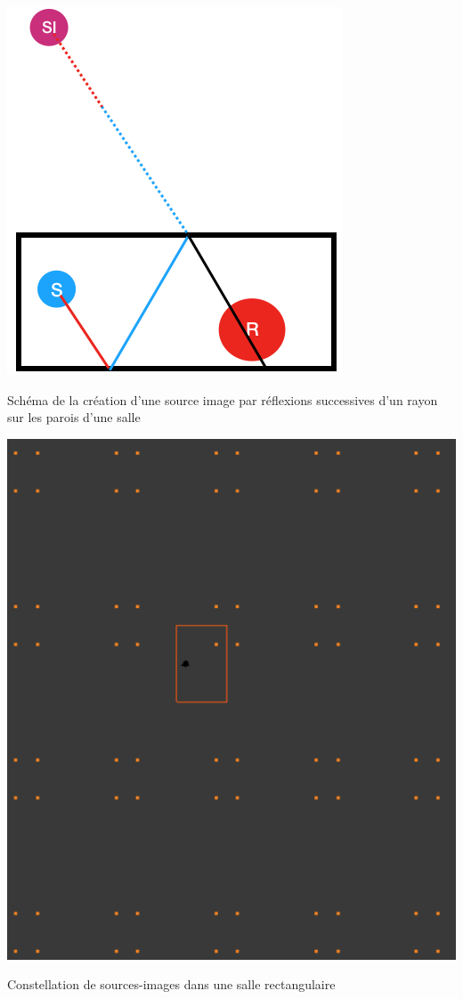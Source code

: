 \begin{figureth}
	\begin{subfigureth}{0.45\textwidth}
		\includegraphics[width=0.8\linewidth]{images/schema_SI}
		\caption{Schéma de la création d'une source image par réflexions successives d'un rayon sur les parois d'une salle}
		\label{schema_SI}
	\end{subfigureth}
	\qquad
	\begin{subfigureth}{0.45\textwidth}
		\includegraphics[width=0.8\linewidth]{images/constellation}
		\caption{Constellation de sources-images dans une salle rectangulaire}
		\label{constellation}
	\end{subfigureth}
\end{figureth}












